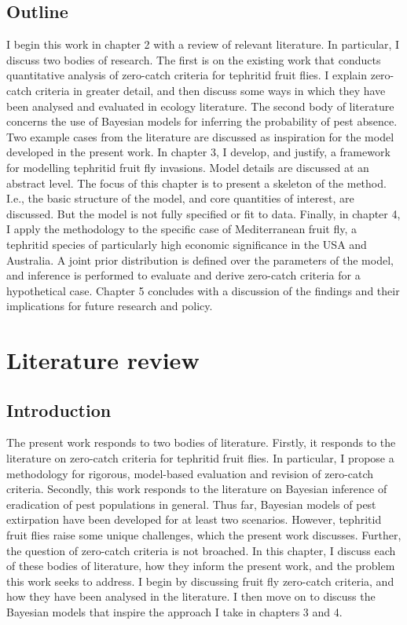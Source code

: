 \documentclass[
  oneside]{book}
\begin{document}
\hypertarget{outline}{%
\section{Outline}\label{outline}}

I begin this work in chapter 2 with a review of relevant literature. In particular, I discuss two bodies of research. The first is on the existing work that conducts quantitative analysis of zero-catch criteria for tephritid fruit flies. I explain zero-catch criteria in greater detail, and then discuss some ways in which they have been analysed and evaluated in ecology literature. The second body of literature concerns the use of Bayesian models for inferring the probability of pest absence. Two example cases from the literature are discussed as inspiration for the model developed in the present work. In chapter 3, I develop, and justify, a framework for modelling tephritid fruit fly invasions. Model details are discussed at an abstract level. The focus of this chapter is to present a skeleton of the method. I.e., the basic structure of the model, and core quantities of interest, are discussed. But the model is not fully specified or fit to data. Finally, in chapter 4, I apply the methodology to the specific case of Mediterranean fruit fly, a tephritid species of particularly high economic significance in the USA and Australia. A joint prior distribution is defined over the parameters of the model, and inference is performed to evaluate and derive zero-catch criteria for a hypothetical case. Chapter 5 concludes with a discussion of the findings and their implications for future research and policy.

\hypertarget{lit-review}{%
\chapter{Literature review}\label{lit-review}}

\hypertarget{introduction-1}{%
\section{Introduction}\label{introduction-1}}

The present work responds to two bodies of literature. Firstly, it responds to the literature on zero-catch criteria for tephritid fruit flies. In particular, I propose a methodology for rigorous, model-based evaluation and revision of zero-catch criteria. Secondly, this work responds to the literature on Bayesian inference of eradication of pest populations in general. Thus far, Bayesian models of pest extirpation have been developed for at least two scenarios. However, tephritid fruit flies raise some unique challenges, which the present work discusses. Further, the question of zero-catch criteria is not broached. In this chapter, I discuss each of these bodies of literature, how they inform the present work, and the problem this work seeks to address. I begin by discussing fruit fly zero-catch criteria, and how they have been analysed in the literature. I then move on to discuss the Bayesian models that inspire the approach I take in chapters 3 and 4.
\end{document}

